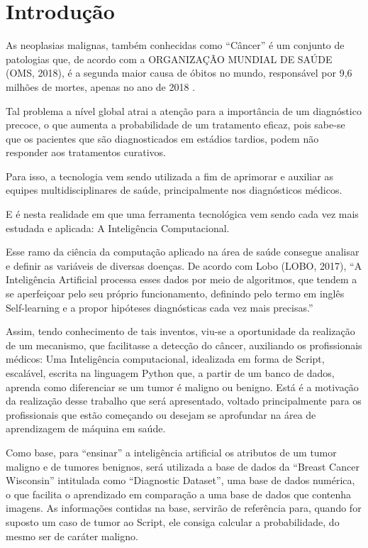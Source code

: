 \chapter{Introdução}
\label{chapter:introducao}

As neoplasias malignas, também conhecidas como “Câncer” é um conjunto de patologias que,
de acordo com a ORGANIZAÇÃO MUNDIAL DE SAÚDE (OMS, 2018),
é a segunda maior causa de óbitos no mundo,
responsável por 9,6 milhões de mortes, apenas no ano de 2018 \cite{ESTATISTICACANCER}
.

Tal problema a nível global atrai a atenção para a importância de um diagnóstico precoce,
o que aumenta a probabilidade de um tratamento eficaz, pois sabe-se que os pacientes que são diagnosticados em estádios tardios,
podem não responder aos tratamentos curativos.

Para isso, a tecnologia vem sendo utilizada a fim de aprimorar e auxiliar as equipes multidisciplinares de saúde,
principalmente nos diagnósticos médicos.

E é nesta realidade em que uma ferramenta tecnológica vem sendo cada vez mais estudada e aplicada:
A Inteligência Computacional.

Esse ramo da ciência da computação aplicado na área de saúde consegue analisar e definir as variáveis de diversas doenças.
De acordo com Lobo (LOBO, 2017), “A Inteligência Artificial processa esses dados por meio de algoritmos,
que tendem a se aperfeiçoar pelo seu próprio funcionamento,
definindo pelo termo em inglês Self-learning e a propor hipóteses diagnósticas cada vez mais precisas.”
\cite{IAEMSAUDE}

Assim, tendo conhecimento de tais inventos, viu-se a oportunidade da realização de um mecanismo,
que facilitasse a detecção do câncer, auxiliando os profissionais médicos:
Uma Inteligência computacional, idealizada em forma de Script, escalável, escrita na linguagem Python que,
a partir de um banco de dados, aprenda como diferenciar se um tumor é maligno ou benigno.
Está é a motivação da realização desse trabalho que será apresentado,
voltado principalmente para os profissionais que estão começando ou desejam se
aprofundar na área de aprendizagem de máquina em saúde.

Como base, para “ensinar” a inteligência artificial os atributos de um tumor maligno e de tumores benignos,
será utilizada a base de dados da “Breast Cancer Wisconsin” intitulada como “Diagnostic Dataset”,
uma base de dados numérica, o que facilita o aprendizado em comparação a uma base de dados que contenha imagens.
As informações contidas na base,
servirão de referência para, quando for suposto um caso de tumor ao Script, ele consiga calcular a probabilidade,
do mesmo ser de caráter maligno.


